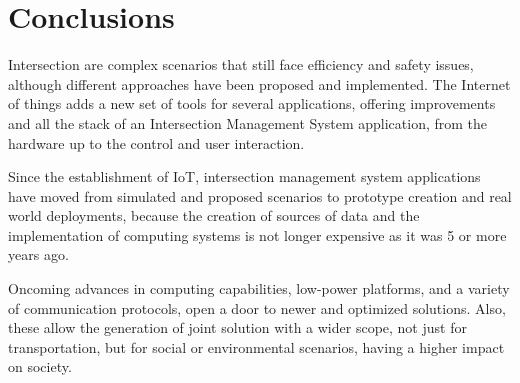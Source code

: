 \documentclass[conference]{IEEEtran}
\begin{document}










\section{Conclusions}

Intersection are complex scenarios that still face efficiency and safety issues, although different approaches have been proposed and implemented. The Internet of things adds a new set of tools for several applications, offering improvements and all the stack of an Intersection Management System application, from the hardware up to the control and user interaction.

Since the establishment of IoT, intersection management system applications have moved from simulated and proposed scenarios to prototype creation and real world deployments, because the creation of sources of data and the implementation of computing systems is not longer expensive as it was 5 or more years ago.

Oncoming advances in computing capabilities, low-power platforms, and a variety of communication protocols, open a door to newer and optimized solutions. Also, these allow the generation of joint solution with a wider scope, not just for transportation, but for social or environmental scenarios, having a higher impact on society.



\end{document}
